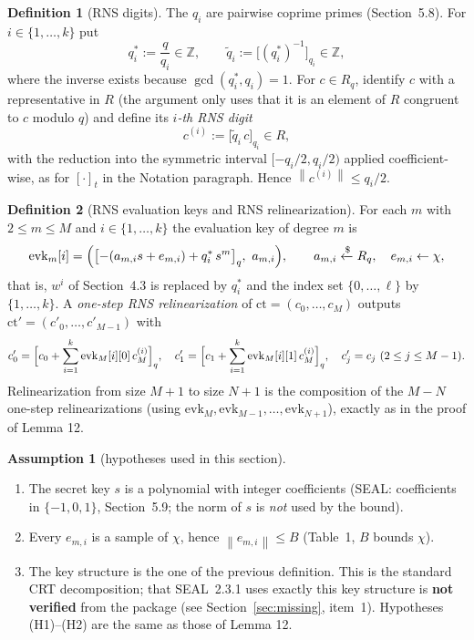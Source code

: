 \documentclass[11pt]{article}
\newcommand{\norm}[1]{\left\lVert #1\right\rVert}
\newcommand{\ct}{\mathrm{ct}}
\newcommand{\qstar}[1]{q^{*}_{#1}}
\newcommand{\qtilde}[1]{\tilde{q}_{#1}}
\theoremstyle{plain}
\theoremstyle{definition}
\newtheorem*{definition*}{Definition}
\newtheorem*{assumption*}{Assumption}
\theoremstyle{remark}
\begin{document}
\begin{definition*}[RNS digits]
The $q_i$ are pairwise coprime primes (Section~5.8). For $i\in\{1,\dots,k\}$ put
\[
 \qstar{i}:=\frac{q}{q_i}\in\mathbb{Z},\qquad
 \qtilde{i}:=\bigl[(\qstar{i})^{-1}\bigr]_{q_i}\in\mathbb{Z},
\]
where the inverse exists because $\gcd(\qstar{i},q_i)=1$. For $c\in R_q$, identify $c$
with a representative in $R$ (the argument only uses that it is an element of $R$
congruent to $c$ modulo $q$) and define its \emph{$i$-th RNS digit}
\[
 c^{(i)}:=\bigl[\qtilde{i}\,c\bigr]_{q_i}\in R,
\]
with the reduction into the symmetric interval $[-q_i/2,q_i/2)$ applied coefficient-wise,
as for $[\cdot]_t$ in the Notation paragraph. Hence $\norm{c^{(i)}}\leq q_i/2$.
\end{definition*}

\begin{definition*}[RNS evaluation keys and RNS relinearization]
For each $m$ with $2\leq m\leq M$ and $i\in\{1,\dots,k\}$ the evaluation key of degree $m$ is
\[
 \mathrm{evk}_m[i]=\Bigl(\bigl[-(a_{m,i}s+e_{m,i})+\qstar{i}\,s^m\bigr]_q,\ a_{m,i}\Bigr),
 \qquad a_{m,i}\xleftarrow{\$}R_q,\quad e_{m,i}\leftarrow\chi,
\]
that is, $w^i$ of Section~4.3 is replaced by $\qstar{i}$ and the index set
$\{0,\dots,\ell\}$ by $\{1,\dots,k\}$. A \emph{one-step RNS relinearization} of
$\ct=(c_0,\dots,c_M)$ outputs $\ct'=(c'_0,\dots,c'_{M-1})$ with
\[
 c'_0=\Bigl[c_0+\sum_{i=1}^{k}\mathrm{evk}_M[i][0]\,c_M^{(i)}\Bigr]_q,\quad
 c'_1=\Bigl[c_1+\sum_{i=1}^{k}\mathrm{evk}_M[i][1]\,c_M^{(i)}\Bigr]_q,\quad
 c'_j=c_j\ (2\leq j\leq M-1).
\]
Relinearization from size $M+1$ to size $N+1$ is the composition of the $M-N$
one-step relinearizations (using $\mathrm{evk}_M,\mathrm{evk}_{M-1},\dots,\mathrm{evk}_{N+1}$),
exactly as in the proof of Lemma 12.
\end{definition*}

\begin{assumption*}[hypotheses used in this section]
\begin{enumerate}[leftmargin=2em,label=(H\arabic*)]
\item The secret key $s$ is a polynomial with integer coefficients (SEAL: coefficients in $\{-1,0,1\}$,
      Section~5.9; the norm of $s$ is \emph{not} used by the bound).
\item Every $e_{m,i}$ is a sample of $\chi$, hence $\norm{e_{m,i}}\leq B$ (Table~1, $B$ bounds $\chi$).
\item The key structure is the one of the previous definition. This is the standard
      CRT decomposition; that SEAL~2.3.1 uses exactly this key structure is \textbf{not verified}
      from the package (see Section~\ref{sec:missing}, item~1). Hypotheses (H1)--(H2) are
      the same as those of Lemma 12.
\end{enumerate}
\end{assumption*}
\end{document}
